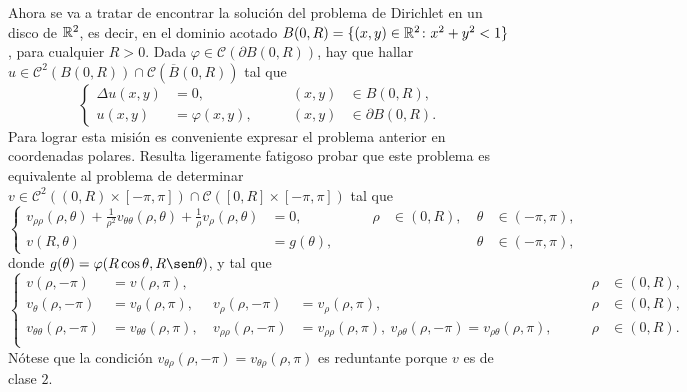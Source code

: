 \documentclass[a4paper, 12pt, extrafontsizes]{memoir}
\begin{document}
Ahora se va a tratar de encontrar la solución del problema de Dirichlet en un disco de $\mathbb R^2$, es decir, en el dominio acotado $B(0,R) = \{(x,y) \in \mathbb R^2 \colon x^2+y^2 < 1 \}$, para cualquier $R >0$. Dada $\varphi \in \mathcal{C}(\partial B(0,R))$, hay que hallar $u \in \mathcal{C}^2(B(0,R)) \cap \mathcal{C}(\overline{B}(0,R))$ tal que
\[\left\{\begin{alignedat}{3}
    \Delta u(x,y) &= 0, \qquad & (x,y) &\in B(0,R), \\
    u(x,y) &= \varphi(x,y), \qquad & (x,y) &\in \partial B(0,R).
\end{alignedat}\right.\]
Para lograr esta misión es conveniente expresar el problema anterior en coordenadas polares. Resulta ligeramente fatigoso probar que este problema es equivalente al problema de determinar $v \in \mathcal{C}^2((0,R) \times [-\pi,\pi]) \cap \mathcal{C}([0,R] \times [-\pi,\pi])$ tal que
\[\left\{\begin{alignedat}{5}
    v_{\rho\rho}(\rho,\theta)+\frac{1}{\rho^2}v_{\theta\theta}(\rho,\theta)+\frac{1}{\rho}v_\rho(\rho,\theta) &= 0, \qquad & \rho &\in (0,R), \ &\theta &\in (-\pi,\pi), \\
    v(R,\theta) &= g(\theta), \qquad & & & \theta &\in (-\pi,\pi),
\end{alignedat}\right.\]
donde $g(\theta) = \varphi(R\cos\theta,R\sen\theta)$, y tal que
\[\left\{\begin{alignedat}{6}
    v(\rho,-\pi) &= v(\rho,\pi), & & \qquad & \rho &\in (0,R),  \\
    v_\theta(\rho,-\pi) &= v_\theta(\rho,\pi), & \ v_\rho(\rho,-\pi) &= v_\rho(\rho,\pi), \qquad & \rho &\in (0,R), \\
    v_{\theta\theta}(\rho,-\pi) &= v_{\theta\theta}(\rho,\pi), & \ v_{\rho\rho}(\rho,-\pi) &= v_{\rho\rho}(\rho,\pi), \ v_{\rho\theta}(\rho,-\pi) = v_{\rho\theta}(\rho,\pi), \qquad & \rho &\in (0,R).\\
\end{alignedat}\right.\]
Nótese que la condición $v_{\theta\rho}(\rho,-\pi) = v_{\theta\rho}(\rho,\pi)$ es reduntante porque $v$ es de clase $2$.
\end{document}
